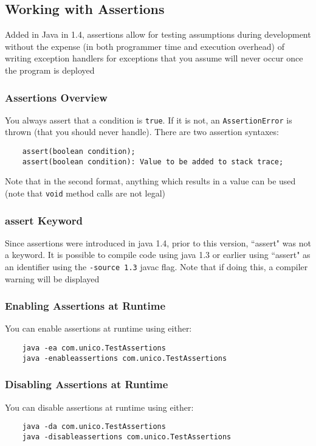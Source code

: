 \subsection{Working with Assertions}
Added in Java in 1.4, assertions allow for testing assumptions during 
development without the expense (in both programmer time and execution 
overhead) of writing exception handlers for exceptions that you assume will 
never occur once the program is deployed

\subsubsection{Assertions Overview}
You always assert that a condition is \verb#true#. If it is not, an 
\verb#AssertionError# is thrown (that you should never handle). There are two 
assertion syntaxes:
\begin{verbatim}
    assert(boolean condition);
    assert(boolean condition): Value to be added to stack trace;
\end{verbatim}
Note that in the second format, anything which results in a value can be used 
(note that \verb#void# method calls are not legal)

\subsubsection{assert Keyword}
Since assertions were introduced in java 1.4, prior to this version, ``assert" 
was not a keyword.  It is possible to compile code using java 1.3 or earlier 
using ``assert" as an identifier using the \verb#-source 1.3# javac flag. Note 
that if doing this, a compiler warning will be displayed

\subsubsection{Enabling Assertions at Runtime}
You can enable assertions at runtime using either:
\begin{verbatim}
    java -ea com.unico.TestAssertions
    java -enableassertions com.unico.TestAssertions
\end{verbatim}

\subsubsection{Disabling Assertions at Runtime}
You can disable assertions at runtime using either:
\begin{verbatim}
    java -da com.unico.TestAssertions
    java -disableassertions com.unico.TestAssertions
\end{verbatim}

